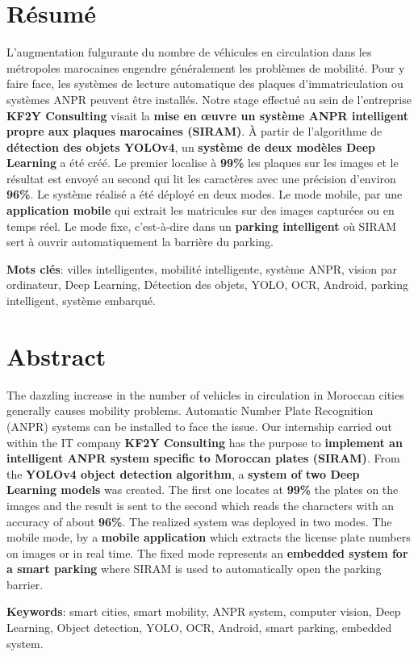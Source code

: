 \chapter*{Résumé}
L’augmentation fulgurante du nombre de véhicules en circulation  dans les métropoles marocaines engendre généralement les problèmes de mobilité. Pour y faire face, les systèmes de lecture automatique des plaques d’immatriculation ou systèmes ANPR peuvent être installés. Notre stage effectué au sein de l'entreprise \textbf{KF2Y Consulting} visait la \textbf{mise en œuvre un système ANPR intelligent propre aux plaques marocaines (SIRAM)}. À partir de l’algorithme de \textbf{détection des objets YOLOv4}, un \textbf{système de deux modèles Deep Learning} a été créé. Le premier localise à \textbf{99\%} les plaques sur les images et le résultat est envoyé au second qui lit les caractères avec une précision d'environ \textbf{96\%}. Le système réalisé a été déployé en deux modes. Le mode mobile, par une \textbf{application mobile} qui extrait les matricules sur des images capturées ou en temps réel. Le mode fixe, c'est-à-dire dans un \textbf{parking intelligent} où SIRAM sert à ouvrir automatiquement la barrière du parking.




\textbf{Mots clés}: villes intelligentes, mobilité intelligente, système ANPR, vision par ordinateur, Deep Learning, Détection des objets, YOLO, OCR, Android, parking intelligent, système embarqué.


\chapter*{Abstract}
The dazzling increase in the number of vehicles in circulation in Moroccan cities generally causes mobility problems. Automatic Number Plate Recognition (ANPR) systems can be installed to face the issue. Our internship carried out within the IT company \textbf{KF2Y Consulting} has the purpose to \textbf{implement an intelligent ANPR system specific to Moroccan plates (SIRAM)}. From the \textbf{YOLOv4 object detection algorithm}, a \textbf{system of two Deep Learning models} was created. The first one locates at \textbf{99\%} the plates on the images and the result is sent to the second which reads the characters with an accuracy of about \textbf{96\%}. The realized system was deployed in two modes. The mobile mode, by a \textbf{mobile application} which extracts the license plate numbers on images or in real time. The fixed mode represents an \textbf{embedded system for a smart parking} where SIRAM is used to automatically open the parking barrier.


\textbf{Keywords}: smart cities, smart mobility, ANPR system, computer vision, Deep Learning, Object detection, YOLO, OCR, Android, smart parking, embedded system.